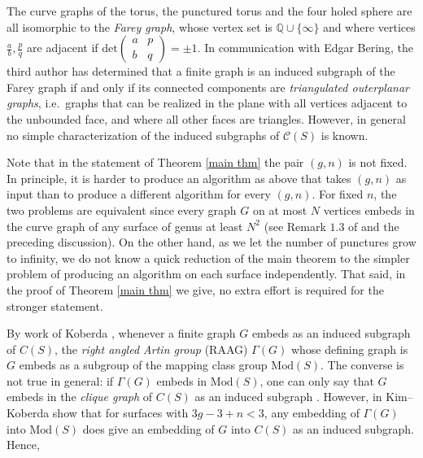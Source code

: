 \documentclass[11pt]{amsart}
\theoremstyle{remark}
\numberwithin{equation}{section}
\newcommand{\Mod}{\mathrm{Mod}}
\newcommand{\Q}{\mathbb{Q}}
\begin{document}
The curve graphs of the torus, the punctured torus and the four holed sphere are all isomorphic to the \emph{Farey graph}, whose  vertex set is $\Q \cup \{\infty\}$ and where vertices $\frac ab, \frac pq$  are adjacent if $\mathrm{det} \left (\begin{smallmatrix}
	a & p \\ b & q 
\end{smallmatrix}\right )=\pm1.$
In communication with Edgar Bering, the third author has determined that a finite graph is an induced subgraph of the Farey graph if and only if its connected components are \emph{triangulated outerplanar graphs}, i.e.\ graphs that can be realized in the plane with all vertices adjacent to the unbounded face, and where all other faces are triangles. However, in general no simple  characterization of the induced subgraphs of $\mathcal C(S)$ is known.

 Note that in the statement of Theorem \ref{main thm} the pair $(g,n)$ is not fixed.  In principle, it is harder to produce an algorithm as above that takes $(g,n)$ as input than to produce a different algorithm for every $(g,n)$. For fixed $n$, the two problems are equivalent since every graph $G$ on at most $N$ vertices embeds in the curve graph of any surface of genus at least $N^{2}$ (see Remark $1.3$ of \cite{BeringGaster} and the preceding discussion). On the other hand, as we let the number of punctures grow to infinity, we do not know a quick reduction of the main theorem to the simpler problem of producing an algorithm on each surface independently. That said, in the proof of Theorem \ref{main thm} we give, no extra effort is required for the stronger statement.
 


By work of Koberda \cite{koberda2012right},   whenever a finite graph $G$  embeds  as an induced subgraph of $C(S)$, the \emph{right angled Artin group} (RAAG) $\Gamma(G)$ whose defining graph is $G$ embeds  as a subgroup of the mapping class group $\Mod(S)$.  The converse is not true in general: if $\Gamma(G)$  embeds in $\Mod(S)$, one can only say that $G$ embeds in the \emph{clique graph} of $C(S)$ as an induced subgraph \cite{kim2014geometry}. However, in \cite{kim2013right} Kim--Koberda show that for surfaces with $3g-3+n<3$, any embedding of $\Gamma(G)$ into $\Mod(S)$ does give an embedding of $G $ into $C(S)$  as an  induced subgraph. Hence,
\end{document}
